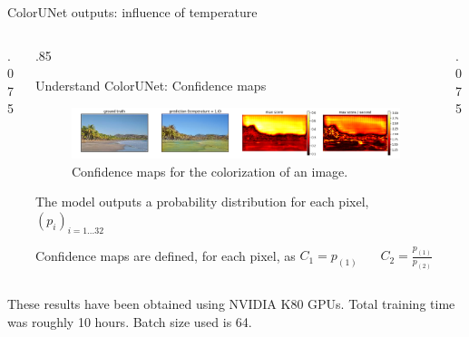\documentclass[final]{beamer}
\newlength{\onecolwid}
\newlength{\twocolwid}
\begin{document}
\begin{frame}[t]
\begin{columns}[t]
\begin{column}{\twocolwid}
\begin{block}{ColorUNet outputs: influence of temperature}
  \end{block}

  \begin{columns}[t,totalwidth=.7\twocolwid] %
    \begin{column}{.075\twocolwid}\end{column}
    \begin{column}{.85\twocolwid}

    \begin{alertblock}{Understand ColorUNet: Confidence maps}

    \begin{figure}
    \begin{center}
    \includegraphics[width=.6\twocolwid]{img/confidence}
    \caption{Confidence maps for the colorization of an image.}
    \label{confidence}
    \end{center}
    \end{figure}

    The model outputs a probability distribution for each pixel, $(p_i)_{i=1...32}$

    Confidence maps are defined, for each pixel, as
    $C_1 = p_{(1)}\ \ \ \ \ \ \ \  C_2 = \frac{p_{(1)}}{p_{(2)}}$
    \end{alertblock}

    \end{column}
    \begin{column}{.075\twocolwid}\end{column}
  \end{columns}



\begin{columns}[t,totalwidth=\twocolwid] %

\begin{column}{\onecolwid} %

\begin{block}{}
These results have been obtained using NVIDIA K80 GPUs. Total training time was roughly 10 hours. Batch size used is 64.


\end{block}
\end{column}
\end{columns}
\end{column}
\end{columns}
\end{frame}
\end{document}
